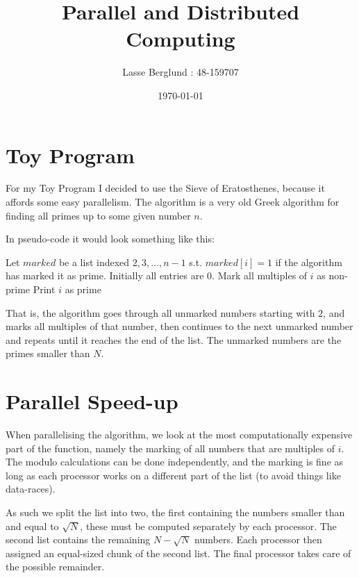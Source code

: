 \documentclass[12pt]{report}
\title{Parallel and Distributed Computing}
\author{Lasse Berglund : 48-159707}
\date{\today}
\begin{document}
\maketitle

\section*{Toy Program}

For my Toy Program I decided to use the Sieve of Eratosthenes, because it affords some easy parallelism. The algorithm is a very old Greek algorithm for finding all primes up to some given number $n$.

In pseudo-code it would look something like this:

\begin{algorithmic}
  	\State Let $marked$ be a list indexed $2,3,\ldots,n-1$ s.t.
  	\State $marked[i] = 1$ if the algorithm has marked it as prime.
  	\State Initially all entries are $0$. 
    		\State Mark all multiples of $i$ as non-prime
    	\EndIf
    \EndFor
    		\State Print $i$ as prime
    	\EndIf
    \EndFor
  \EndFunction
\end{algorithmic}

That is, the algorithm goes through all unmarked numbers starting with $2$, and marks all multiples of that number, then continues to the next unmarked number and repeats until it reaches the end of the list. The unmarked numbers are the primes smaller than $N$.

\section*{Parallel Speed-up}

When parallelising the algorithm, we look at the most computationally expensive part of the function, namely the marking of all numbers that are multiples of $i$. The modulo calculations can be done independently, and the marking is fine as long as each processor works on a different part of the list (to avoid things like data-races).

As such we split the list into two, the first containing the numbers smaller than and equal to $\sqrt N$, these must be computed separately by each processor. The second list contains the remaining $N-\sqrt N$ numbers. Each processor then assigned an equal-sized chunk of the second list. The final processor takes care of the possible remainder.
\end{document}
